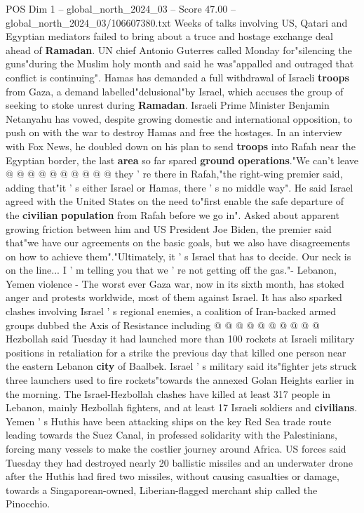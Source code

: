 \begin{textsample}{POS Dim 1 – global\_north\_2024\_03 – Score 47.00 – global\_north\_2024\_03/106607380.txt}
Weeks of talks involving US, Qatari and Egyptian mediators failed to bring about a truce and hostage exchange deal ahead of \textbf{Ramadan}.
UN chief Antonio Guterres called Monday for"silencing the guns"during the Muslim holy month and said he was"appalled and outraged that conflict is continuing".
Hamas has demanded a full withdrawal of Israeli \textbf{troops} from Gaza, a demand labelled"delusional"by Israel, which accuses the group of seeking to stoke unrest during \textbf{Ramadan}.
Israeli Prime Minister Benjamin Netanyahu has vowed, despite growing domestic and international opposition, to push on with the war to destroy Hamas and free the hostages.
In an interview with Fox News, he doubled down on his plan to send \textbf{troops} into Rafah near the Egyptian border, the last \textbf{area} so far spared \textbf{ground} \textbf{operations}."We can't leave @ @ @ @ @ @ @ @ @ @ they ' re there in Rafah,"the right-wing premier said, adding that"it ' s either Israel or Hamas, there ' s no middle way".
He said Israel agreed with the United States on the need to"first enable the safe departure of the \textbf{civilian} \textbf{population} from Rafah before we go in".
Asked about apparent growing friction between him and US President Joe Biden, the premier said that"we have our agreements on the basic goals, but we also have disagreements on how to achieve them"."Ultimately, it ' s Israel that has to decide.
Our neck is on the line...
I ' m telling you that we ' re not getting off the gas."- Lebanon, Yemen violence - The worst ever Gaza war, now in its sixth month, has stoked anger and protests worldwide, most of them against Israel.
It has also sparked clashes involving Israel ' s regional enemies, a coalition of Iran-backed armed groups dubbed the Axis of Resistance including @ @ @ @ @ @ @ @ @ @ Hezbollah said Tuesday it had launched more than 100 rockets at Israeli military positions in retaliation for a strike the previous day that killed one person near the eastern Lebanon \textbf{city} of Baalbek.
Israel ' s military said its"fighter jets struck three launchers used to fire rockets"towards the annexed Golan Heights earlier in the morning.
The Israel-Hezbollah clashes have killed at least 317 people in Lebanon, mainly Hezbollah fighters, and at least 17 Israeli soldiers and \textbf{civilians}.
Yemen ' s Huthis have been attacking ships on the key Red Sea trade route leading towards the Suez Canal, in professed solidarity with the Palestinians, forcing many vessels to make the costlier journey around Africa.
US forces said Tuesday they had destroyed nearly 20 ballistic missiles and an underwater drone after the Huthis had fired two missiles, without causing casualties or damage, towards a Singaporean-owned, Liberian-flagged merchant ship called the Pinocchio.

\end{textsample}
